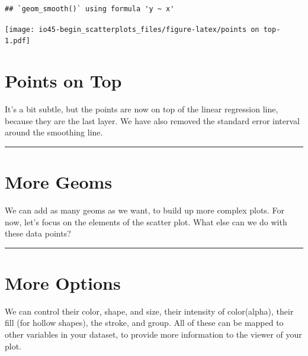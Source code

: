 \documentclass[
]{book}
\newenvironment{Shaded}{\begin{snugshade}}{\end{snugshade}}
\newcommand{\DataTypeTok}[1]{\textcolor[rgb]{0.13,0.29,0.53}{#1}}
\newcommand{\DecValTok}[1]{\textcolor[rgb]{0.00,0.00,0.81}{#1}}
\newcommand{\KeywordTok}[1]{\textcolor[rgb]{0.13,0.29,0.53}{\textbf{#1}}}
\newcommand{\NormalTok}[1]{#1}
\newcommand{\OperatorTok}[1]{\textcolor[rgb]{0.81,0.36,0.00}{\textbf{#1}}}
\newcommand{\StringTok}[1]{\textcolor[rgb]{0.31,0.60,0.02}{#1}}
\begin{document}
\begin{verbatim}
## `geom_smooth()` using formula 'y ~ x'
\end{verbatim}

\texttt{[image: io45-begin\_scatterplots\_files/figure-latex/points on top-1.pdf]}

\hypertarget{points-on-top-1}{%
\chapter{Points on Top}\label{points-on-top-1}}

It's a bit subtle, but the points are now on top of the linear regression line, because they are the last layer. We have also removed the standard error interval around the smoothing line.

\begin{center}\rule{0.5\linewidth}{0.5pt}\end{center}

\hypertarget{more-geoms}{%
\chapter{More Geoms}\label{more-geoms}}

We can add as many geoms as we want, to build up more complex plots. For now, let's focus on the elements of the scatter plot. What else can we do with these data points?

\begin{center}\rule{0.5\linewidth}{0.5pt}\end{center}

\hypertarget{more-options}{%
\chapter{More Options}\label{more-options}}

We can control their color, shape, and size, their intensity of color(alpha), their fill (for hollow shapes), the stroke, and group. All of these can be mapped to other variables in your dataset, to provide more information to the viewer of your plot.

\begin{Shaded}
\end{Shaded}
\end{document}
